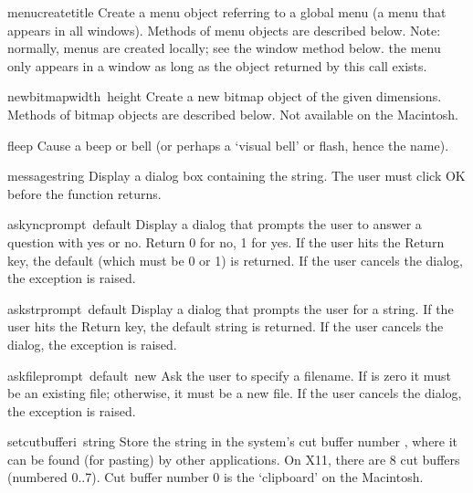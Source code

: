 \begin{funcdesc}{menucreate}{title}
Create a menu object referring to a global menu (a menu that appears in
all windows).
Methods of menu objects are described below.
Note: normally, menus are created locally; see the window method
 below.
 the menu only appears in a window as long as the object
returned by this call exists.
\end{funcdesc}

\begin{funcdesc}{newbitmap}{width\, height}
Create a new bitmap object of the given dimensions.
Methods of bitmap objects are described below.
Not available on the Macintosh.
\end{funcdesc}

\begin{funcdesc}{fleep}{}
Cause a beep or bell (or perhaps a `visual bell' or flash, hence the
name).
\end{funcdesc}

\begin{funcdesc}{message}{string}
Display a dialog box containing the string.
The user must click OK before the function returns.
\end{funcdesc}

\begin{funcdesc}{askync}{prompt\, default}
Display a dialog that prompts the user to answer a question with yes or
no.
Return 0 for no, 1 for yes.
If the user hits the Return key, the default (which must be 0 or 1) is
returned.
If the user cancels the dialog, the
exception is raised.
\end{funcdesc}

\begin{funcdesc}{askstr}{prompt\, default}
Display a dialog that prompts the user for a string.
If the user hits the Return key, the default string is returned.
If the user cancels the dialog, the
exception is raised.
\end{funcdesc}

\begin{funcdesc}{askfile}{prompt\, default\, new}
Ask the user to specify a filename.
If
is zero it must be an existing file; otherwise, it must be a new file.
If the user cancels the dialog, the
exception is raised.
\end{funcdesc}

\begin{funcdesc}{setcutbuffer}{i\, string}
Store the string in the system's cut buffer number
,
where it can be found (for pasting) by other applications.
On X11, there are 8 cut buffers (numbered 0..7).
Cut buffer number 0 is the `clipboard' on the Macintosh.
\end{funcdesc}

